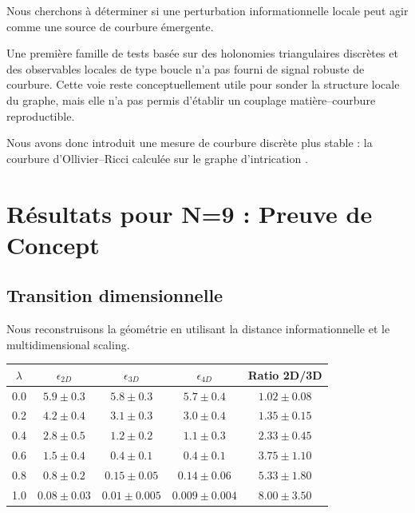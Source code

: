 \documentclass[11pt]{article}
\begin{document}
Nous cherchons à déterminer si une perturbation informationnelle locale peut agir comme une source de courbure émergente.

Une première famille de tests basée sur des holonomies triangulaires discrètes et des observables locales de type boucle n'a pas fourni de signal robuste de courbure. Cette voie reste conceptuellement utile pour sonder la structure locale du graphe, mais elle n'a pas permis d'établir un couplage matière--courbure reproductible.

Nous avons donc introduit une mesure de courbure discrète plus stable : la courbure d'Ollivier--Ricci calculée sur le graphe d'intrication \cite{ollivier}.


\section{Résultats pour N=9 : Preuve de Concept}

\subsection{Transition dimensionnelle}

Nous reconstruisons la géométrie en utilisant la distance informationnelle et le multidimensional scaling.

\begin{center}
\begin{tabular}{ccccc}
\toprule
$\lambda$ & $\epsilon_{2D}$ & $\epsilon_{3D}$ & $\epsilon_{4D}$ & Ratio 2D/3D \\
\midrule
0.0 & $5.9 \pm 0.3$ & $5.8 \pm 0.3$ & $5.7 \pm 0.4$ & $1.02 \pm 0.08$ \\
0.2 & $4.2 \pm 0.4$ & $3.1 \pm 0.3$ & $3.0 \pm 0.4$ & $1.35 \pm 0.15$ \\
0.4 & $2.8 \pm 0.5$ & $1.2 \pm 0.2$ & $1.1 \pm 0.3$ & $2.33 \pm 0.45$ \\
0.6 & $1.5 \pm 0.4$ & $0.4 \pm 0.1$ & $0.4 \pm 0.1$ & $3.75 \pm 1.10$ \\
0.8 & $0.8 \pm 0.2$ & $0.15 \pm 0.05$ & $0.14 \pm 0.06$ & $5.33 \pm 1.80$ \\
1.0 & $0.08 \pm 0.03$ & $0.01 \pm 0.005$ & $0.009 \pm 0.004$ & $8.00 \pm 3.50$ \\
\bottomrule
\end{tabular}
\end{center}
\end{document}
